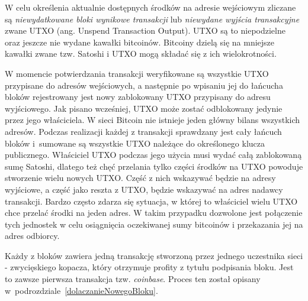 \documentclass[12pt, oneside, final, openany]{mgr}
\begin{document}
\indent W celu określenia aktualnie dostępnych środków na adresie wejściowym zliczane są \textit{niewydatkowane bloki wynikowe transakcji} lub \textit{niewydane wyjścia transakcyjne} zwane UTXO (ang. Unspend Transaction Output). UTXO są to niepodzielne oraz jeszcze nie wydane kawałki bitcoinów. Bitcoiny dzielą się na mniejsze kawałki zwane tzw. Satoshi i UTXO mogą składać się z ich wielokrotności. 

\indent W momencie potwierdzania transakcji weryfikowane są wszystkie UTXO przypisane do adresów wejściowych, a następnie po wpisaniu jej do łańcucha bloków rejestrowany jest nowy zablokowany UTXO przypisany do adresu wyjściowego. Jak pisano wcześniej, UTXO może zostać odblokowany jedynie przez jego właściciela. W sieci Bitcoin nie istnieje jeden główny bilans wszystkich adresów. Podczas realizacji każdej z transakcji sprawdzany jest cały łańcuch bloków i~sumowane są wszystkie UTXO należące do określonego klucza publicznego. Właściciel UTXO podczas jego użycia musi wydać całą zablokowaną sumę Satoshi, dlatego też chęć przelania tylko części środków na UTXO powoduje stworzenie wielu nowych UTXO. Część z nich wskazywać będzie na adresy wyjściowe, a część jako reszta z UTXO, będzie wskazywać na adres nadawcy transakcji. Bardzo często zdarza się sytuacja, w której to właściciel wielu UTXO chce przelać środki na jeden adres. W takim przypadku dozwolone jest połączenie tych jednostek w celu osiągnięcia oczekiwanej sumy bitcoinów i przekazania jej na adres odbiorcy. 

\indent Każdy z bloków zawiera jedną transakcję stworzoną przez jednego uczestnika sieci - zwycięskiego kopacza, który otrzymuje profity z tytułu podpisania bloku. Jest to zawsze pierwsza transakcja tzw. \textit{coinbase}. Proces ten został opisany w~podrozdziale~\ref{dolaczanieNowegoBloku}.
\end{document}
